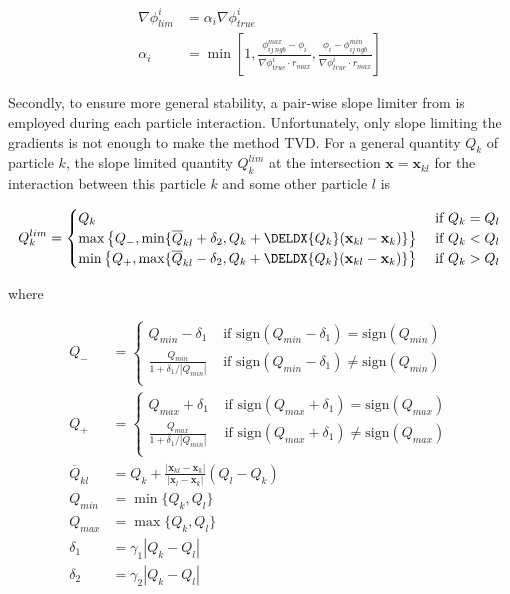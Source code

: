 \begin{align}
	\nabla \phi_{lim}^i &= \alpha_i \nabla \phi^i_{true} \label{eq:cell-limiter-first}\\
	\alpha_i &= \min\left[ 1, \frac{\phi_{ij\ ngb}^{max} - \phi_i}{\nabla \phi^i_{true} \cdot
r_{max}}, \frac{\phi_i - \phi_{ij\ ngb}^{min}}{\nabla \phi^i_{true} \cdot r_{max}} \right]
\label{eq:cell-limiter-last}
\end{align}


Secondly, to ensure more general stability, a pair-wise slope limiter from
\cite{hopkinsGIZMONewClass2015} is employed during each particle interaction. Unfortunately, only
slope limiting the gradients is not enough to make the method TVD. For a general quantity $Q_k$ of
particle $k$, the slope limited quantity $Q_k^{lim}$ at the intersection $\mathbf{x} =
\mathbf{x}_{kl}$ for the interaction between this particle $k$ and some other particle $l$ is

\begin{equation}
	Q_k^{lim} =
	\begin{cases}
		Q_k
						& \text{ if } Q_k = Q_l \\
		\max\left\{ Q_-,
			\min\{ \overline{Q}_{kl} + \delta_2, Q_k + \DELDX{Q_k} (\mathbf{x}_{kl} -
\mathbf{x}_k)\}
		\right\}
						& \text{ if } Q_k < Q_l \\
		\min\left\{ Q_+,
			\max\{ \overline{Q}_{kl} - \delta_2, Q_k + \DELDX{Q_k} (\mathbf{x}_{kl} -
\mathbf{x}_k)\}
		\right\}
						& \text{ if } Q_k > Q_l
	\end{cases}  \label{eq:face-limiter-first}
\end{equation}


where


\begin{align}
Q_- &=
	\begin{cases}
		Q_{min} - \delta_1
						& \text{ if } \mathrm{sign} (Q_{min} - \delta_1) = \mathrm{sign} (Q_{min})\\
		\frac{Q_{min}}{1 + \delta_1 / | Q_{min}|}
						& \text{ if } \mathrm{sign} (Q_{min} - \delta_1) \neq \mathrm{sign}
(Q_{min}) \\
	\end{cases}\\
%
Q_+ &=
	\begin{cases}
		Q_{max} + \delta_1
						& \text{ if } \mathrm{sign} (Q_{max} + \delta_1) = \mathrm{sign} (Q_{max})
\\
		\frac{Q_{max}}{1 + \delta_1 / | Q_{min}|}
						& \text{ if } \mathrm{sign} (Q_{max} + \delta_1) \neq \mathrm{sign}
(Q_{max}) \\
	\end{cases}\\
%
\overline{Q}_{kl} &=
	Q_k + \frac{|\mathbf{x}_{kl} - \mathbf{x}_{k}|}{|\mathbf{x}_{l} - \mathbf{x}_{k}|} (Q_l -
Q_k)\\
%
Q_{min} &= \min\{ Q_k, Q_l \} \\
Q_{max} &= \max\{ Q_k, Q_l \} \\
\delta_1 &= \gamma_1 | Q_k - Q_l | \\
\delta_2 &= \gamma_2 | Q_k - Q_l |  \label{eq:face-limiter-last}
\end{align}

